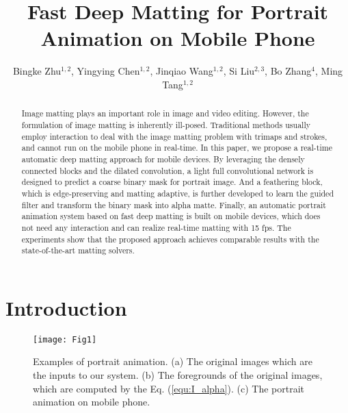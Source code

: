 \documentclass[sigconf]{acmart}
\begin{document}
\title{Fast Deep Matting for Portrait Animation on Mobile Phone}
\author{Bingke Zhu$^{1,2}$, Yingying Chen$^{1,2}$, Jinqiao Wang$^{1,2}$, Si Liu$^{2,3}$, Bo Zhang$^{4}$, Ming Tang$^{1,2}$}

\begin{abstract}
Image matting plays an important role in image and video editing. However, the formulation of image matting is inherently ill-posed. Traditional methods usually employ interaction to deal with the image matting problem with trimaps and strokes, and cannot run on the mobile phone in real-time. In this paper, we propose a real-time automatic deep matting approach for mobile devices. By leveraging the densely connected blocks and the dilated convolution, a light full convolutional network is designed to predict a coarse binary mask for portrait image. And a feathering block, which is edge-preserving and matting adaptive, is further developed to learn the guided filter and transform the binary mask into alpha matte. Finally, an automatic portrait animation system based on fast deep matting is built on mobile devices, which does not need any interaction and can realize real-time matting with 15 fps. The experiments show that the proposed approach achieves comparable results with the state-of-the-art matting solvers.
\end{abstract}


\maketitle

\section{Introduction}\begin{figure}
\centering
\texttt{[image: Fig1]}
\caption{Examples of portrait animation. (a) The original images which are the inputs to our system.
(b) The foregrounds of the original images, which are computed by the Eq. (\ref{equ:I_alpha}).
(c) The portrait animation on mobile phone.}
\label{tag:portraitanimation}
\end{figure}
\end{document}
